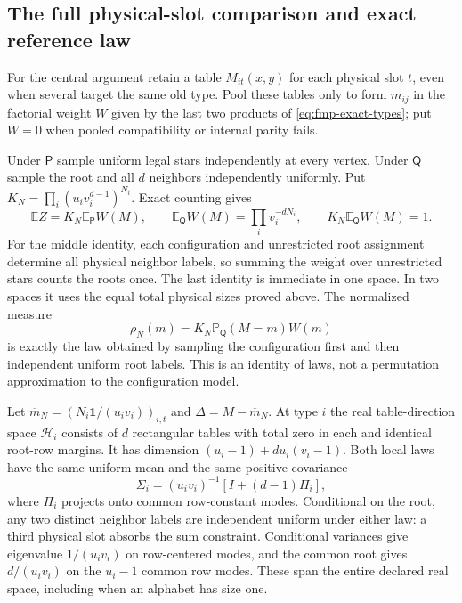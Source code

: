 \subsection{The full physical-slot comparison and exact reference law}
For the central argument retain a table $M_{it}(x,y)$ for each
physical slot $t$, even when several target the same old type. Pool
these tables only to form $m_{ij}$ in the factorial weight $W$ given
by the last two products of \eqref{eq:fmp-exact-types}; put $W=0$
when pooled compatibility or internal parity fails.

Under $\mathsf P$ sample uniform legal stars independently at every
vertex. Under $\mathsf Q$ sample the root and all $d$ neighbors
independently uniformly. Put
$K_N=\prod_i(u_iv_i^{d-1})^{N_i}$. Exact counting gives
\begin{equation}\label{eq:fmp-normalizers}
 \mathbb E Z=K_N\mathbb E_{\mathsf P}W(M),\qquad
 \mathbb E_{\mathsf Q}W(M)=\prod_i v_i^{-dN_i},\qquad
 K_N\mathbb E_{\mathsf Q}W(M)=1.
\end{equation}
For the middle identity, each configuration and unrestricted root
assignment determine all physical neighbor labels, so summing the
weight over unrestricted stars counts the roots once. The last
identity is immediate in one space. In two spaces it uses the equal
total physical sizes proved above. The normalized measure
\begin{equation}\label{eq:fmp-reference}
 \rho_N(m)=K_N\mathbb P_{\mathsf Q}(M=m)W(m)
\end{equation}
is exactly the law obtained by sampling the configuration first and
then independent uniform root labels. This is an identity of laws,
not a permutation approximation to the configuration model.

Let $\overline m_N=(N_i\mathbf1/(u_iv_i))_{i,t}$ and
$\Delta=M-\overline m_N$. At type $i$ the real table-direction space
$\mathcal H_i$ consists of $d$ rectangular tables with total zero in
each and identical root-row margins. It has dimension
$(u_i-1)+du_i(v_i-1)$. Both local laws have the same uniform mean and
the same positive covariance
\begin{equation}\label{eq:fmp-covariance}
 \Sigma_i=(u_iv_i)^{-1}[I+(d-1)\Pi_i],
\end{equation}
where $\Pi_i$ projects onto common row-constant modes. Conditional on
the root, any two distinct neighbor labels are independent uniform
under either law: a third physical slot absorbs the sum constraint.
Conditional variances give eigenvalue $1/(u_iv_i)$ on row-centered
modes, and the common root gives $d/(u_iv_i)$ on the $u_i-1$ common
row modes. These span the entire declared real space, including when
an alphabet has size one.

